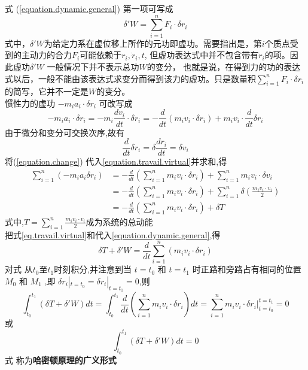 \documentclass{book}
\begin{document}
式 (\ref{equation.dynamic.general})
第一项可写成
\begin{equation}
 \delta 'W=\sum_{i=1}^n F_i \cdot \delta r_i
 \label{eq.travail.virtual}
\end{equation}
式中，$\delta'W$为给定力系在虚位移上所作的元功即虚功。需要指出是，第$i$个质点受到的主动力的合力$F_i$可能依赖于$r_i,\dot{r}_i,t$,
但虚功表达式中并不包含带有$\dot{r}_i$的项。因此虚功$\delta 'W$ 一般情况下并不表示总功$W$的变分，
也就是说，在得到力的功的表达式以后，一般不能由该表达式求变分而得到该力的虚功。只是数量积$\sum_{i=1}^n F_i \cdot \delta r_i$的简写，它并不一定是$W$的变分。 \\
惯性力的虚功 $ -m_ia_i\cdot \delta r_i $ 可改写成
\begin{equation}
-m_ia_i\cdot \delta r_i=-m_i \frac{dv_i}{dt} \cdot \delta r_i = - \frac{d}{dt}(m_i v_i \cdot \delta r_i) + m_i v_i \cdot \frac{d}{dt}\delta r_i
\label{equation.travail.virtual}
\end{equation}
由于微分和变分可交换次序,故有
\begin{equation}
 \frac{d}{dt}\delta r_i =\delta \frac{dr_i}{dt} =\delta v_i
 \label{equation.change}
\end{equation}
将(\ref{equation.change}) 代入\eqref{equation.travail.virtual}并求和,得
\begin{equation}
 \begin{split}
  \sum_{i=1}^n (-m_ia_i \delta r_i)& = -\frac{d}{dt}(\sum_{i=1}^n m_i v_i \cdot \delta r_i) + \sum_{i=1}^n m_i v_i\cdot \delta v_i\\
  & = -\frac{d}{dt}(\sum_{i=1}^n m_i v_i \cdot \delta r_i) + \sum_{i=1}^n \delta (\frac{m_i v_i \cdot v_i}{2}) \\
  & = -\frac{d}{dt}(\sum_{i=1}^n m_i v_i \cdot \delta r_i) + \delta T
 \end{split}
\end{equation}
式中,$T=\sum_{i=1}^n \frac{m_i v_i \cdot v_i}{2}$成为系统的总动能 \\
把式\eqref{eq.travail.virtual}和\lasteq 代入\eqref{equation.dynamic.general},得
\begin{equation}
 \delta T + \delta 'W =\frac{d}{dt}\sum_{i=1}^n (m_i v_i \cdot \delta r_i)
\end{equation}
对式 \lasteq 从$t_0$至$t_1$时刻积分,并注意到当 $t=t_0$ 和 $t=t_1$ 时正路和旁路占有相同的位置 $M_0$ 和 $M_1$ ,即
$ \delta r_i|_{t=t_0}= \delta r_i|_{t=t_1}= 0 $,则
\begin{equation}
\int_{t_0}^{t_1}(\delta T + \delta ' W)dt
= \int_{t_0}^{t_1}\frac{d}{dt}(\sum_{i=1}^n m_i v_i \cdot \delta r_i)dt
= \sum_{i=1}^n m_i v_i \cdot \delta r_i|_{t=t_0}^{t=t_1}
= 0
\end{equation}
或
\begin{equation}
 \int_{t_0}^{t_1}(\delta T + \delta ' W)dt=0
\end{equation}
式 \lasteq 称为\textbf{哈密顿原理的广义形式}
\end{document}
